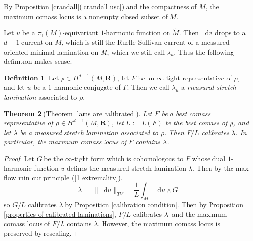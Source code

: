 \documentclass[reqno,11pt]{amsart}
\newcommand{\RR}{\mathbf{R}}
\newcommand*\dif{\mathop{}\!\mathrm{d}}
\newcommand{\dfn}[1]{\emph{#1}\index{#1}}
\newtheorem{theorem}{Theorem}[section]
\theoremstyle{definition}
\newtheorem{definition}[theorem]{Definition}
\numberwithin{equation}{section}
\begin{document}
By Proposition \ref{crandall}(\ref{crandall usc}) and the compactness of $M$, the maximum comass locus is a nonempty closed subset of $M$.

Let $u$ be a $\pi_1(M)$-equivariant $1$-harmonic function on $\tilde M$.
Then $\dif u$ drops to a $d-1$-current on $M$, which is still the Ruelle-Sullivan current of a measured oriented minimal lamination on $M$, which we still call $\lambda_u$.
Thus the following definition makes sense.

\begin{definition}
Let $\rho \in H^{d - 1}(M, \RR)$, let $F$ be an $\infty$-tight representative of $\rho$, and let $u$ be a $1$-harmonic conjugate of $F$.
Then we call $\lambda_u$ a \dfn{measured stretch lamination} associated to $\rho$.
\end{definition}

\begin{theorem}[Theorem \ref{lams are calibrated}]\label{MCL contains Thurston}
Let $F$ be a best comass representative of $\rho \in H^{d - 1}(M, \RR)$, let $L := L(F)$ be the best comass of $\rho$, and let $\lambda$ be a measured stretch lamination associated to $\rho$.
Then $F/L$ calibrates $\lambda$. In particular, the maximum comass locus of $F$ contains $\lambda$.
\end{theorem}
\begin{proof}
Let $G$ be the $\infty$-tight form which is cohomologous to $F$ whose dual $1$-harmonic function $u$ defines the measured stretch lamination $\lambda$.
Then by the max flow min cut principle (\ref{1 extremality}), 
$$|\lambda| = \|\dif u\|_{TV} = \frac{1}{L} \int_M \dif u \wedge G$$
so $G/L$ calibrates $\lambda$ by Proposition \ref{calibration condition}.
Then by Proposition \ref{properties of calibrated laminations}, $F/L$ calibrates $\lambda$, and the maximum comass locus of $F/L$ contains $\lambda$.
However, the maximum comass locus is preserved by rescaling.
\end{proof}
\end{document}
